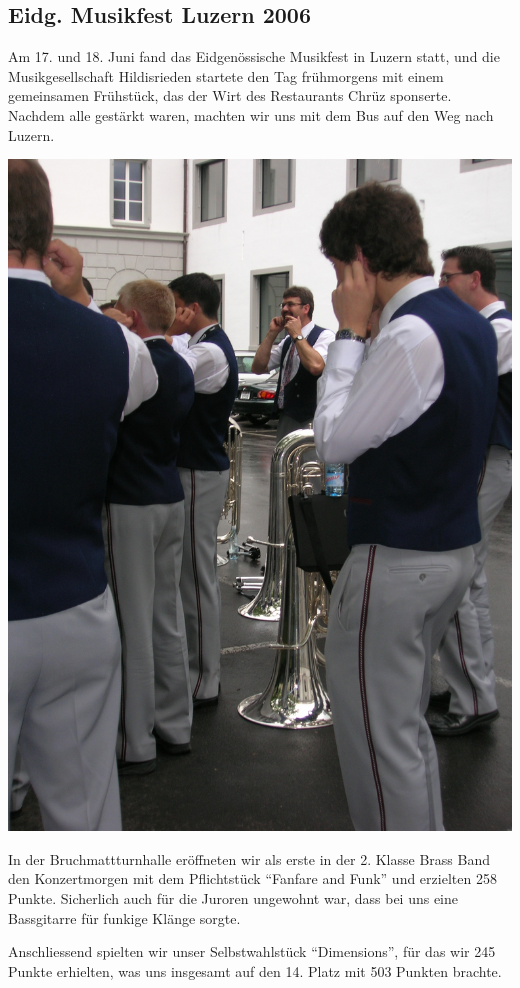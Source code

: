 \subsection*{Eidg. Musikfest Luzern 2006}

\begin{history}

    Am 17. und 18. Juni fand das Eidgenössische Musikfest in Luzern statt, und
    die Musikgesellschaft Hildisrieden startete den Tag frühmorgens mit einem
    gemeinsamen Frühstück, das der Wirt des Restaurants Chrüz sponserte. Nachdem
    alle gestärkt waren, machten wir uns mit dem Bus auf den Weg nach Luzern.

    \begin{MulticolFigure}
        \centering
        \includegraphics[width=0.7\linewidth]{./chap/2001-2024/2006/Mentale-Einstimmung.jpg}
    \end{MulticolFigure}

    In der Bruchmattturnhalle eröffneten wir als erste in der 2. Klasse Brass
    Band den Konzertmorgen mit dem Pflichtstück \enquote{Fanfare and Funk} und
    erzielten 258 Punkte. Sicherlich auch für die Juroren ungewohnt war, dass
    bei uns eine Bassgitarre für funkige Klänge sorgte.

    Anschliessend spielten wir unser Selbstwahlstück \enquote{Dimensions}, für
    das wir 245 Punkte erhielten, was uns insgesamt auf den 14. Platz mit 503
    Punkten brachte.


\end{history}
